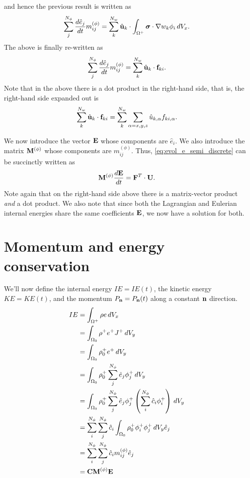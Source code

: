 \documentclass[11pt]{article}
\begin{document}
and hence the previous result is written as
\begin{equation}
    \sum_j^{N_\phi} \frac{d \hat{e}_j}{dt} m_{ij}^{(\phi)} = \sum_k^{N_w} \hat{\mathbf{u}}_k \cdot \int_{\Omega^+} \bm \sigma \cdot \nabla w_k \phi_i \, dV_x.
\end{equation}
The above is finally re-written as
\begin{equation}
    \label{eq:evol_e_semi_discrete}
    \sum_j^{N_\phi} \frac{d \hat{e}_j}{d t} m^{(\phi)}_{ij} = \sum_k^{N_w} \hat{\mathbf{u}}_k \cdot \mathbf{f}_{ki}.
\end{equation}
Note that in the above there is a dot product in the right-hand side, that is, the right-hand side expanded out is  
\begin{equation}
    \sum_k^{N_w} \hat{\mathbf{u}}_k \cdot \mathbf{f}_{ki} = \sum_k^{N_w} \sum_{\alpha=x,y,z} \hat{u}_{k,\alpha} f_{ki,\alpha}.
\end{equation}

We now introduce the vector $\mathbf{E}$ whose components are $\hat{e}_i$. We also introduce the matrix $\mathbf{M}^{(\phi)}$ whose components are $m_{ij}^{(\phi)}$. Thus, \cref{eq:evol_e_semi_discrete} can be succinctly written as
\begin{equation}
    \mathbf{M}^{(\phi)} \frac{d\mathbf{E}}{dt} = \mathbf{F}^T \cdot \mathbf{U}.
\end{equation}
Note again that on the right-hand side above there is a matrix-vector product \textit{and} a dot product. We also note that since both the Lagrangian and Eulerian internal energies share the same coefficients $\mathbf{E}$, we now have a solution for both.

\section{Momentum and energy conservation}
We'll now define the internal energy $IE=IE(t)$, the kinetic energy $KE=KE(t)$, and the momentum $P_{\mathbf{n}}=P_{\mathbf{n}}(t)$ along a constant $\mathbf{n}$ direction.
\begin{align}
    IE &= \int_{\Omega^+} \rho e \, dV_x \nonumber \\
    &= \int_{\Omega_0} \rho^+ e^+ J^+ \, dV_y \nonumber \\
    &= \int_{\Omega_0} \rho^+_0 e^+ \, dV_y \nonumber \\
    &= \int_{\Omega_0} \rho_0^+ \sum_{j}^{N_\phi} \hat{e}_j \phi_j^+ \, dV_y \nonumber \\
    &= \int_{\Omega_0} \rho_0^+ \sum_{j}^{N_\phi} \hat{e}_j \phi_j^+ \left ( \sum_{i}^{N_\phi} \hat{c}_i \phi^+_i \right ) \, dV_y \nonumber \\
    &= \sum_i^{N_\phi} \sum_j^{N_\phi} \hat{c}_i \int_{\Omega_0} \rho_0^+ \phi_i^+ \phi_j^+ \, dV_y \hat{e}_j \nonumber \\
    &= \sum_i^{N_\phi} \sum_j^{N_\phi} \hat{c}_i m_{ij}^{(\phi)} \hat{e}_j \nonumber \\
    &= \mathbf{C} \mathbf{M}^{(\phi)} \mathbf{E} 
\end{align}
\end{document}
